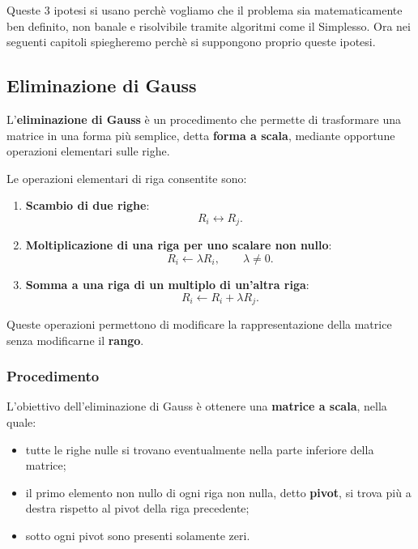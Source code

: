 Queste 3 ipotesi si usano perchè vogliamo che il problema sia matematicamente ben definito, non banale e risolvibile tramite algoritmi come il Simplesso.   
Ora nei seguenti capitoli spiegheremo perchè si suppongono proprio queste ipotesi.

\subsection{Eliminazione di Gauss}

L'\textbf{eliminazione di Gauss} è un procedimento che permette di trasformare una matrice in una forma più semplice, detta \textbf{forma a scala}, mediante opportune operazioni elementari sulle righe.

Le operazioni elementari di riga consentite sono:

\begin{enumerate}
    \item \textbf{Scambio di due righe}:
    \[
    R_i \leftrightarrow R_j.
    \]

    \item \textbf{Moltiplicazione di una riga per uno scalare non nullo}:
    \[
    R_i \leftarrow \lambda R_i,
    \qquad \lambda \neq 0.
    \]

    \item \textbf{Somma a una riga di un multiplo di un'altra riga}:
    \[
    R_i \leftarrow R_i + \lambda R_j.
    \]
\end{enumerate}

Queste operazioni permettono di modificare la rappresentazione della matrice senza modificarne il \textbf{rango}.

\subsubsection*{Procedimento}

L'obiettivo dell'eliminazione di Gauss è ottenere una \textbf{matrice a scala}, nella quale:

\begin{itemize}
    \item tutte le righe nulle si trovano eventualmente nella parte inferiore della matrice;
    \item il primo elemento non nullo di ogni riga non nulla, detto \textbf{pivot}, si trova più a destra rispetto al pivot della riga precedente;
    \item sotto ogni pivot sono presenti solamente zeri.
\end{itemize}


